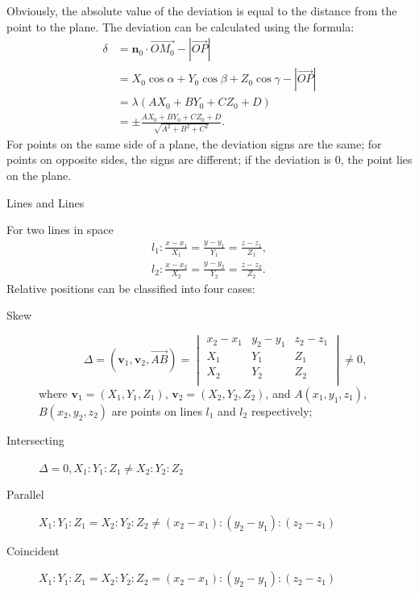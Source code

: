 \documentclass[11pt]{../../TexTemplate/elegantbook} %
\begin{document}
Obviously, the absolute value of the deviation is equal to the distance from the point to the plane.
The deviation can be calculated using the formula:
\begin{align*}
    \delta &= \mathbf{n}_{0} \cdot \vec{OM_{0}} - |\vec{OP}|\\ 
    &= X_{0}\cos \alpha + Y_{0}\cos \beta + Z_{0}\cos \gamma - |\vec{OP}| \\
    &= \lambda (A X_{0} + B Y_{0} + C Z_{0} + D) \\
    &= \pm \frac{A X_{0} + B Y_{0} + C Z_{0} + D}{\sqrt{A^2 + B^2 + C^2}}.
\end{align*}
For points on the same side of a plane, the deviation signs are the same; 
for points on opposite sides, the signs are different; 
if the deviation is \(0\), the point lies on the plane.


\begin{leftbarTitle}{Lines and Lines}\end{leftbarTitle}
For two lines in space
\begin{gather*}
    l_{1}: \frac{x - x_{1}}{X_{1}} = \frac{y - y_{1}}{Y_{1}} = \frac{z - z_{1}}{Z_{1}}, \\
    l_{2}: \frac{x - x_{2}}{X_{2}} = \frac{y - y_{2}}{Y_{2}} = \frac{z - z_{2}}{Z_{2}}.
\end{gather*}
Relative positions can be classified into four cases:
\begin{description}
    \item[Skew] 
        \[\Delta = \left( \mathbf{v}_{1}, \mathbf{v}_{2}, \vec{AB} \right) =
        \begin{vmatrix}
            x_{2} - x_{1} & y_{2} - y_{1} & z_{2} - z_{1} \\
            X_{1} & Y_{1} & Z_{1} \\
            X_{2} & Y_{2} & Z_{2} \\
        \end{vmatrix} \neq 0,
        \]
        where \(\mathbf{v}_{1} = (X_{1}, Y_{1}, Z_{1})\), \(\mathbf{v}_{2} = (X_{2}, Y_{2}, Z_{2})\),
        and \(A(x_{1}, y_{1}, z_{1})\), \(B(x_{2}, y_{2}, z_{2})\) are points on lines \(l_{1}\) and \(l_{2}\) respectively;
    \item[Intersecting] \(\Delta = 0, X_{1}:Y_{1}:Z_{1}\neq X_{2}:Y_{2}:Z_{2}\)
    \item[Parallel] \(X_{1}:Y_{1}:Z_{1} = X_{2}:Y_{2}:Z_{2} \neq (x_{2}-x_{1}): (y_{2}-y_{1}): (z_{2}-z_{1})\)
    \item[Coincident] \(X_{1}:Y_{1}:Z_{1} = X_{2}:Y_{2}:Z_{2} = (x_{2}-x_{1}): (y_{2}-y_{1}): (z_{2}-z_{1})\)
\end{description}
\end{document}
